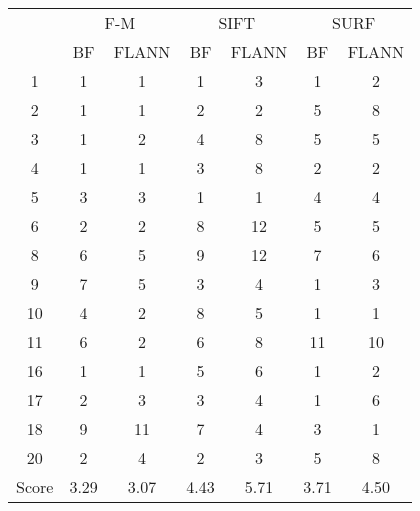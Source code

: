 \documentclass[draft,final]{vutinfth} %
\begin{document}
\begin{appendices}
\begin{minipage}{\linewidth}
 \label{tab:20Mean} 
\end{minipage}

\begin{minipage}{\linewidth}
\centering
\begin{tabular}{c|cc|cc|cc}
\multirow{2}{*}{ } & \multicolumn{2}{c}{ F-M } & \multicolumn{2}{c}{ SIFT } & \multicolumn{2}{c}{ SURF } \\
& BF & FLANN & BF & FLANN & BF & FLANN \\
\hline
1 & 1 & 1 & 1 & 3 & 1 & 2 \\
2 & 1 & 1 & 2 & 2 & 5 & 8 \\
3 & 1 & 2 & 4 & 8 & 5 & 5 \\
4 & 1 & 1 & 3 & 8 & 2 & 2 \\
5 & 3 & 3 & 1 & 1 & 4 & 4 \\
6 & 2 & 2 & 8 & 12 & 5 & 5 \\
8 & 6 & 5 & 9 & 12 & 7 & 6 \\
9 & 7 & 5 & 3 & 4 & 1 & 3 \\
10 & 4 & 2 & 8 & 5 & 1 & 1 \\
11 & 6 & 2 & 6 & 8 & 11 & 10 \\
16 & 1 & 1 & 5 & 6 & 1 & 2 \\
17 & 2 & 3 & 3 & 4 & 1 & 6 \\
18 & 9 & 11 & 7 & 4 & 3 & 1 \\
20 & 2 & 4 & 2 & 3 & 5 & 8 \\
\hline
Score & 3.29 & 3.07 & 4.43 & 5.71 & 3.71 & 4.50 \\
\end{tabular}

 \label{tab:20Cent} 
\end{minipage}


\end{appendices}
\end{document}
